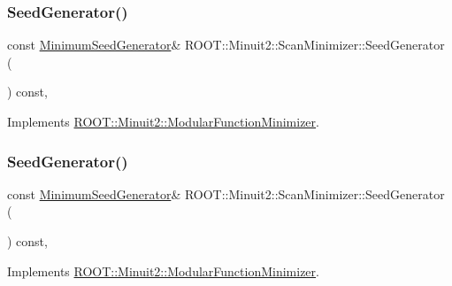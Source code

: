 \mbox{\label{classROOT_1_1Minuit2_1_1ScanMinimizer_aaad34811cf2862cd8b66b634a1c9ba07}} 
\subsubsection{\texorpdfstring{SeedGenerator()}{SeedGenerator()}\hspace{0.1cm}{\footnotesize\ttfamily [1/3]}}
{\footnotesize\ttfamily const \mbox{\hyperlink{classROOT_1_1Minuit2_1_1MinimumSeedGenerator}{Minimum\+Seed\+Generator}}\& R\+O\+O\+T\+::\+Minuit2\+::\+Scan\+Minimizer\+::\+Seed\+Generator (\begin{DoxyParamCaption}{ }\end{DoxyParamCaption}) const\hspace{0.3cm}{\ttfamily [inline]}, {\ttfamily [virtual]}}



Implements \mbox{\hyperlink{classROOT_1_1Minuit2_1_1ModularFunctionMinimizer_a742930de97b0ce9ba23773874ae0894b}{R\+O\+O\+T\+::\+Minuit2\+::\+Modular\+Function\+Minimizer}}.

\mbox{\label{classROOT_1_1Minuit2_1_1ScanMinimizer_aaad34811cf2862cd8b66b634a1c9ba07}} 
\subsubsection{\texorpdfstring{SeedGenerator()}{SeedGenerator()}\hspace{0.1cm}{\footnotesize\ttfamily [2/3]}}
{\footnotesize\ttfamily const \mbox{\hyperlink{classROOT_1_1Minuit2_1_1MinimumSeedGenerator}{Minimum\+Seed\+Generator}}\& R\+O\+O\+T\+::\+Minuit2\+::\+Scan\+Minimizer\+::\+Seed\+Generator (\begin{DoxyParamCaption}{ }\end{DoxyParamCaption}) const\hspace{0.3cm}{\ttfamily [inline]}, {\ttfamily [virtual]}}



Implements \mbox{\hyperlink{classROOT_1_1Minuit2_1_1ModularFunctionMinimizer_a742930de97b0ce9ba23773874ae0894b}{R\+O\+O\+T\+::\+Minuit2\+::\+Modular\+Function\+Minimizer}}.

